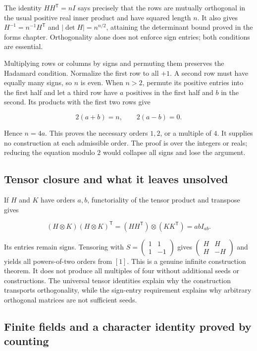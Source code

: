 \documentclass[
  11pt,
]{article}
\begin{document}
The identity \(HH^{\mathsf T}=nI\) says precisely that the rows are
mutually orthogonal in the usual positive real inner product and have
squared length \(n\). It also gives \(H^{-1}=n^{-1}H^{\mathsf T}\) and
\(|\det H|=n^{n/2}\), attaining the determinant bound proved in the
forms chapter. Orthogonality alone does not enforce sign entries; both
conditions are essential.

Multiplying rows or columns by signs and permuting them preserves the
Hadamard condition. Normalize the first row to all \(+1\). A second row
must have equally many signs, so \(n\) is even. When \(n>2\), permute
its positive entries into the first half and let a third row have \(a\)
positives in the first half and \(b\) in the second. Its products with
the first two rows give

\[2(a+b)=n,\qquad2(a-b)=0.\]

Hence \(n=4a\). This proves the necessary orders \(1,2\), or a multiple
of \(4\). It supplies no construction at each admissible order. The
proof is over the integers or reals; reducing the equation modulo \(2\)
would collapse all signs and lose the argument.

\subsection{Tensor closure and what it leaves
unsolved}\label{tensor-closure-and-what-it-leaves-unsolved}

If \(H\) and \(K\) have orders \(a,b\), functoriality of the tensor
product and transpose gives

\[(H\otimes K)(H\otimes K)^{\mathsf T}
=(HH^{\mathsf T})\otimes(KK^{\mathsf T})=abI_{ab}.\]

Its entries remain signs. Tensoring with
\(S=\begin{pmatrix}1&1\\1&-1\end{pmatrix}\) gives
\(\begin{pmatrix}H&H\\H&-H\end{pmatrix}\) and yields all powers-of-two
orders from \([1]\). This is a genuine infinite construction theorem. It
does not produce all multiples of four without additional seeds or
constructions. The universal tensor identities explain why the
construction transports orthogonality, while the sign-entry requirement
explains why arbitrary orthogonal matrices are not sufficient seeds.

\subsection{Finite fields and a character identity proved by
counting}\label{finite-fields-and-a-character-identity-proved-by-counting}
\end{document}
